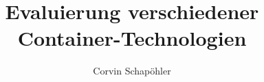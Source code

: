 

\title{Evaluierung verschiedener Container-Technologien}
\author{Corvin Schapöhler}


	
	
	
	
	\frontmatter
	
%	
	

	\setcounter{tocdepth}{1}
	\tableofcontents

	\mainmatter
	\pagestyle{main}
	
	
	
	\backmatter
	
	
